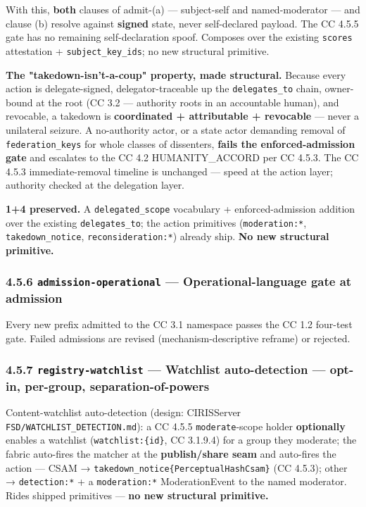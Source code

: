 \documentclass[11pt]{article}
\begin{document}
With this, \textbf{both} clauses of admit-(a) — subject-self and named-moderator — and clause (b) resolve against \textbf{signed} state, never self-declared payload. The CC 4.5.5 gate has no remaining self-declaration spoof. Composes over the existing \texttt{scores} attestation + \texttt{subject\_key\_ids}; no new structural primitive.


\textbf{The "takedown-isn't-a-coup" property, made structural.} Because every action is delegate-signed, delegator-traceable up the \texttt{delegates\_to} chain, owner-bound at the root (CC 3.2 — authority roots in an accountable human), and revocable, a takedown is \textbf{coordinated + attributable + revocable} — never a unilateral seizure. A no-authority actor, or a state actor demanding removal of \texttt{federation\_keys} for whole classes of dissenters, \textbf{fails the enforced-admission gate} and escalates to the CC 4.2 HUMANITY\_ACCORD per CC 4.5.3. The CC 4.5.3 immediate-removal timeline is unchanged — speed at the action layer; authority checked at the delegation layer.


\textbf{1+4 preserved.} A \texttt{delegated\_scope} vocabulary + enforced-admission addition over the existing \texttt{delegates\_to}; the action primitives (\texttt{moderation:*}, \texttt{takedown\_notice}, \texttt{reconsideration:*}) already ship. \textbf{No new structural primitive.}


\subsubsection*{4.5.6 \texttt{admission-operational} — Operational-language gate at admission}


Every new prefix admitted to the CC 3.1 namespace passes the CC 1.2 four-test gate. Failed admissions are revised (mechanism-descriptive reframe) or rejected.


\subsubsection*{4.5.7 \texttt{registry-watchlist} — Watchlist auto-detection — opt-in, per-group, separation-of-powers}


Content-watchlist auto-detection (design: CIRISServer \texttt{FSD/WATCHLIST\_DETECTION.md}): a CC 4.5.5 \texttt{moderate}-scope holder \textbf{optionally} enables a watchlist (\texttt{watchlist:\{id\}}, CC 3.1.9.4) for a group they moderate; the fabric auto-fires the matcher at the \textbf{publish/share seam} and auto-fires the action — CSAM → \texttt{takedown\_notice\{PerceptualHashCsam\}} (CC 4.5.3); other → \texttt{detection:*} + a \texttt{moderation:*} ModerationEvent to the named moderator. Rides shipped primitives — \textbf{no new structural primitive.}
\end{document}
